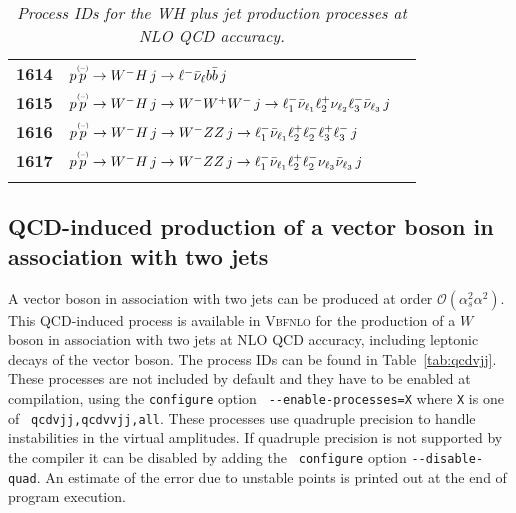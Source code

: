 \documentclass[english,12pt]{article}
\begin{document}
\begin{table}[t!]
\begin{center}
\begin{tabular}{c|l|l}
\bf 1614 & $p \overset{\mbox{\tiny{(--)}}}{p} \to W^- H \, j \to \ell^- \bar{\nu}_{\ell} b\bar{b} \, j $ & \\
\bf 1615 & $p \overset{\mbox{\tiny{(--)}}}{p} \to W^- H \, j \to W^- W^{+}W^{-} \, j \to \ell_{1}^-\bar{\nu}_{\ell_{1}} \ell_{2}^+\nu_{\ell_{2}} \ell_{3}^- \bar{\nu}_{\ell_{3}}\, j $ &  \\
\bf 1616 & $p \overset{\mbox{\tiny{(--)}}}{p} \to W^- H \, j \to W^- ZZ \, j \to \ell_{1}^-\bar{\nu}_{\ell_{1}} \ell_{2}^+ \ell_{2}^- \ell_{3}^+ \ell_{3}^-\, j $ & \\
\bf 1617 & $p \overset{\mbox{\tiny{(--)}}}{p} \to W^- H \, j \to W^- ZZ \, j \to \ell_{1}^-\bar{\nu}_{\ell_{1}} \ell_{2}^+ \ell_{2}^- \nu_{\ell_{3}}  \bar{\nu}_{\ell_{3}}\, j $ & \\
&\\
\hline
\end{tabular}
\caption {\em  Process IDs for the WH plus jet production processes at NLO QCD accuracy.}
\vspace{0.2cm}
\label{tab:whj}
\end{center}
\end{table}



\subsection{QCD-induced production of a vector boson in association with two jets}

%
A vector boson in association with two jets can be produced at order
$\mathcal O(\alpha_s^2 \alpha^2)$. This QCD-induced process is available
in \textsc{Vbfnlo} for the production of a $W$ boson in association with
two jets at NLO QCD accuracy, including leptonic decays of the vector
boson. The process IDs can be found in Table~\ref{tab:qcdvjj}. These
processes are not included by default and they have to be enabled at
compilation, using the {\tt configure} option {\tt
-{}-enable-processes=X} where {\tt X} is one of {\tt
qcdvjj,qcdvvjj,all}. These processes use quadruple precision to handle
instabilities in the virtual amplitudes. If quadruple precision is not
supported by the compiler it can be disabled by adding the {\tt
configure} option {\tt -{}-disable-quad}. An estimate of the error due
to unstable points is printed out at the end of program execution.
\end{document}
